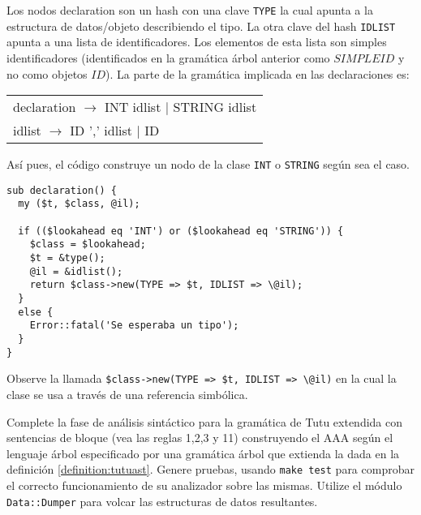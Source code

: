Los nodos declaration son un hash con una clave \verb|TYPE| la cual
apunta a la estructura de datos/objeto
describiendo el tipo. La otra clave del hash \verb|IDLIST| apunta  a una 
lista de identificadores. Los elementos de esta lista son simples
identificadores (identificados en la gramática árbol anterior 
como $SIMPLEID$ y no como objetos $ID$).
La parte de la gramática implicada en las declaraciones es:

\vspace{0.5cm}
\begin{tabular}{l}
declaration  $\rightarrow$ INT  idlist   $|$ STRING   idlist\\
idlist       $\rightarrow$ ID ',' idlist $|$ ID
\end{tabular}
\vspace{0.25cm}

Así pues, el código construye un nodo de la clase 
\verb|INT| o \verb|STRING| según sea el caso.

\begin{verbatim}
sub declaration() {
  my ($t, $class, @il);

  if (($lookahead eq 'INT') or ($lookahead eq 'STRING')) {
    $class = $lookahead;
    $t = &type();
    @il = &idlist();
    return $class->new(TYPE => $t, IDLIST => \@il);
  }
  else {
    Error::fatal('Se esperaba un tipo');
  }
}
\end{verbatim}
Observe la llamada \verb|$class->new(TYPE => $t, IDLIST => \@il)|
en la cual la clase se usa a través de una referencia simbólica.

\label{practica:AAA}
Complete la fase de análisis sintáctico para la gramática  de Tutu extendida 
con sentencias de bloque (vea las reglas 1,2,3 y 11)
construyendo el AAA según el lenguaje árbol especificado  
por una gramática árbol que extienda la dada en la definición 
\ref{definition:tutuast}.
Genere pruebas, usando \verb|make test| 
para comprobar el correcto funcionamiento de su analizador sobre las mismas.
Utilize el módulo \verb|Data::Dumper| para volcar las estructuras de datos
resultantes.

